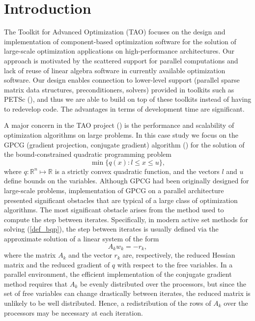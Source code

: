 \documentclass{esub2acm}
\newcommand{\Ref}[1]{\mbox{\rm{(\ref{#1})}}}
\newcommand{\R}{\mbox{${\mathbb R}$}}
\begin{document}
\section{Introduction}

The Toolkit for Advanced Optimization (TAO)
focuses on the design and implementation of
component-based optimization software for the
solution of large-scale optimization applications
on high-performance architectures.
Our approach is motivated by the
scattered support for parallel computations and
lack of reuse of linear algebra software in
currently available optimization software.
Our design enables connection to lower-level
support (parallel sparse matrix data
structures, preconditioners, solvers) provided in toolkits such as
PETSc (),
and thus we are able to build on top of these toolkits
instead of having to redevelop code. The advantages in
terms of development time are significant.

A major concern in the TAO project ()
is the performance and scalability
of optimization algorithms on large problems.
In this case study
we focus on the GPCG
(gradient projection, conjugate gradient)
algorithm ()
for the solution
of the bound-constrained quadratic programming problem
\begin{equation} \label{def_bqp}
\min \{ q(x) : l \leq x \leq u \} ,
\end{equation}
where $q : \R^n \mapsto \R $ is a strictly convex quadratic function,
and the vectors $l$ and $u$ define bounds on the variables.
Although GPCG had been originally designed 
for large-scale problems, implementation of GPCG on a 
parallel architecture presented significant obstacles that
are typical of a large class of optimization algorithms.
The most significant obstacle arises from the 
method used to compute the step between iterates.
Specifically, in modern active set methods for solving
\Ref{def_bqp}, the step between iterates is usually defined
via the approximate solution of a linear system of the form
\[
A_k w_k = - r_k ,
\]
where the matrix $ A_k $ and the vector $r_k$ are, respectively,
the reduced Hessian matrix and the reduced gradient
of $q$ with respect to the free variables.
In a parallel environment, the efficient implementation of the conjugate
gradient method requires that $A_k$ 
be evenly distributed over the processors,
but since the set of free variables can change
drastically between iterates, the reduced matrix is
unlikely to be well distributed. Hence,
a redistribution of the rows of $A_k$ over the processors
may be necessary at each iteration.
\end{document}
